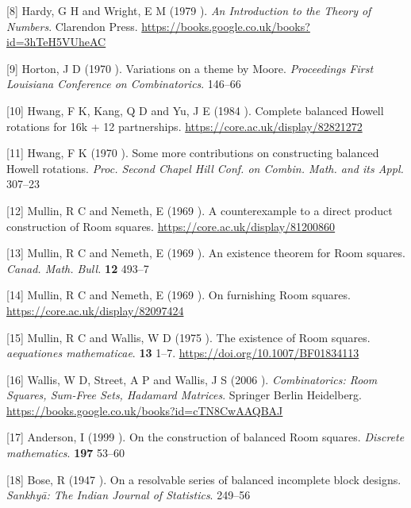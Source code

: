 \documentclass[
  12pt,
  a4paper]{book}
\begin{document}
\leavevmode\hypertarget{ref-hardy_introduction_1979}{}%
{[}8{]} Hardy, G H and Wright, E M (1979 ). \emph{An Introduction to the Theory of Numbers}. Clarendon Press. \url{https://books.google.co.uk/books?id=3hTeH5VUheAC}

\leavevmode\hypertarget{ref-horton_variations_1970}{}%
{[}9{]} Horton, J D (1970 ). Variations on a theme by Moore. \emph{Proceedings First Louisiana Conference on Combinatorics}. 146--66

\leavevmode\hypertarget{ref-hwang_complete_1984}{}%
{[}10{]} Hwang, F K, Kang, Q D and Yu, J E (1984 ). Complete balanced Howell rotations for 16k + 12 partnerships. \url{https://core.ac.uk/display/82821272}

\leavevmode\hypertarget{ref-hwang_more_1970}{}%
{[}11{]} Hwang, F K (1970 ). Some more contributions on constructing balanced Howell rotations. \emph{Proc. Second Chapel Hill Conf. on Combin. Math. and its Appl.} 307--23

\leavevmode\hypertarget{ref-mullin_counterexample_1969}{}%
{[}12{]} Mullin, R C and Nemeth, E (1969 ). A counterexample to a direct product construction of Room squares. \url{https://core.ac.uk/display/81200860}

\leavevmode\hypertarget{ref-mullin_existence_1969}{}%
{[}13{]} Mullin, R C and Nemeth, E (1969 ). An existence theorem for Room squares. \emph{Canad. Math. Bull.} \textbf{12} 493--7

\leavevmode\hypertarget{ref-mullin_furnishing_1969}{}%
{[}14{]} Mullin, R C and Nemeth, E (1969 ). On furnishing Room squares. \url{https://core.ac.uk/display/82097424}

\leavevmode\hypertarget{ref-mullin_existence_1975}{}%
{[}15{]} Mullin, R C and Wallis, W D (1975 ). The existence of Room squares. \emph{aequationes mathematicae}. \textbf{13} 1--7. \url{https://doi.org/10.1007/BF01834113}

\leavevmode\hypertarget{ref-wallis_combinatorics_2006}{}%
{[}16{]} Wallis, W D, Street, A P and Wallis, J S (2006 ). \emph{Combinatorics: Room Squares, Sum-Free Sets, Hadamard Matrices}. Springer Berlin Heidelberg. \url{https://books.google.co.uk/books?id=cTN8CwAAQBAJ}

\leavevmode\hypertarget{ref-anderson_construction_1999}{}%
{[}17{]} Anderson, I (1999 ). On the construction of balanced Room squares. \emph{Discrete mathematics}. \textbf{197} 53--60

\leavevmode\hypertarget{ref-bose_resolvable_1947}{}%
{[}18{]} Bose, R (1947 ). On a resolvable series of balanced incomplete block designs. \emph{Sankhyā: The Indian Journal of Statistics}. 249--56
\end{document}
